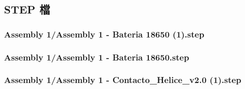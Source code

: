 \documentclass[a4paper,12pt]{article}
\begin{document}
\begin{lstlising}[language=C++]
\begin{center}
\begin{figure}[H]
\begin{minipage}[t]{0.45\textwidth}
\end{minipage}
\hfill
\end{figure}\FloatBarrier\end{center}
\begin{center}\begin{figure}[H]\centering{}\end{figure}\FloatBarrier\end{center}
\begin{center}\begin{figure}[H]\centering{}\end{figure}\FloatBarrier\end{center}
\begin{center}\begin{figure}[H]\centering{}\end{figure}\FloatBarrier\end{center}
\begin{center}\begin{figure}[H]\centering{}\end{figure}\FloatBarrier\end{center}
\begin{center}\begin{figure}[H]\centering{}\end{figure}\FloatBarrier\end{center}
\subsection{STEP 檔}
\subsubsection{Assembly 1/Assembly 1 - Bateria 18650 (1).step}

\subsubsection{Assembly 1/Assembly 1 - Bateria 18650.step}

\subsubsection{Assembly 1/Assembly 1 - Contacto_Helice_v2.0 (1).step}


\end{lstlising}
\end{document}
